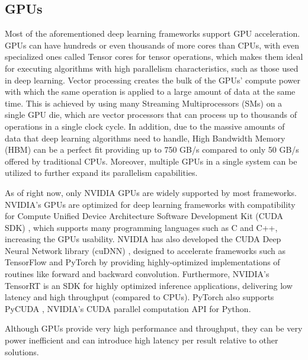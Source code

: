 \subsection{GPUs}
Most of the aforementioned deep learning frameworks support GPU acceleration. GPUs can have hundreds or even thousands of more cores than CPUs, with even specialized ones called Tensor cores for tensor operations, which makes them ideal for executing algorithms with high parallelism characteristics, such as those used in deep learning. Vector processing creates the bulk of the GPUs' compute power with which the same operation is applied to a large amount of data at the same time. This is achieved by using many Streaming Multiprocessors (SMs) on a single GPU die, which are vector processors that can process up to thousands of operations in a single clock cycle. In addition, due to the massive amounts of data that deep learning algorithms need to handle, High Bandwidth Memory (HBM) can be a perfect fit providing up to 750 GB/s compared to only 50 GB/s offered by traditional CPUs. Moreover, multiple GPUs in a single system can be utilized to further expand its parallelism capabilities.

As of right now, only NVIDIA GPUs are widely supported by most frameworks. NVIDIA's GPUs are optimized for deep learning frameworks with compatibility for Compute Unified Device Architecture Software Development Kit (CUDA SDK) \cite{NVIDIA-CUDA}, which supports many programming languages such as C and C++, increasing the GPUs usability. NVIDIA has also developed the CUDA Deep Neural Network library (cuDNN) \cite{cuDNN-Efficient-Primitives-for-Deep-Learning} \cite{NVIDIA-cuDNN}, designed to accelerate frameworks such as TensorFlow and PyTorch by providing highly-optimized implementations of routines like forward and backward convolution. Furthermore, NVIDIA's TensorRT \cite{NVIDIA-TensorRT} is an SDK for high\-ly optimized inference applications, delivering low latency and high throughput (compared to CPUs). PyTorch also supports PyCUDA \cite{NVIDIA-PyCUDA}, NVIDIA's CUDA parallel computation API for Python.

Although GPUs provide very high performance and throughput, they can be very power inefficient and can introduce high latency per result relative to other solutions.

